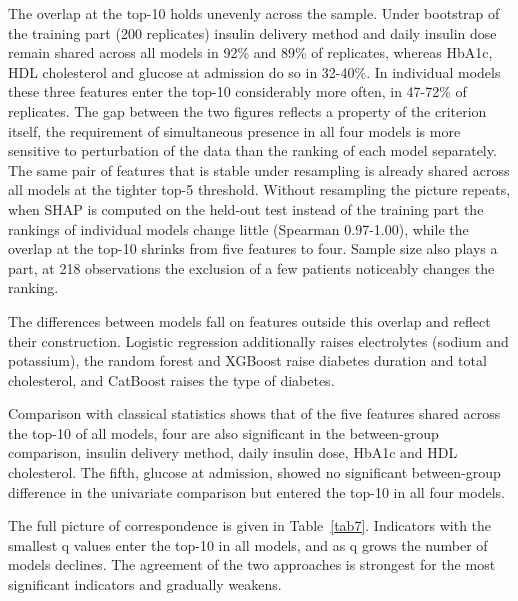 \documentclass[pdflatex,sn-basic,Numbered]{sn-jnl}
\begin{document}
The overlap at the top-10 holds unevenly across the sample. Under bootstrap of the training part (200 replicates) insulin delivery method and daily insulin dose remain shared across all models in 92\% and 89\% of replicates, whereas HbA1c, HDL cholesterol and glucose at admission do so in 32-40\%. In individual models these three features enter the top-10 considerably more often, in 47-72\% of replicates. The gap between the two figures reflects a property of the criterion itself, the requirement of simultaneous presence in all four models is more sensitive to perturbation of the data than the ranking of each model separately. The same pair of features that is stable under resampling is already shared across all models at the tighter top-5 threshold. Without resampling the picture repeats, when SHAP is computed on the held-out test instead of the training part the rankings of individual models change little (Spearman 0.97-1.00), while the overlap at the top-10 shrinks from five features to four. Sample size also plays a part, at 218 observations the exclusion of a few patients noticeably changes the ranking.

The differences between models fall on features outside this overlap and reflect their construction. Logistic regression additionally raises electrolytes (sodium and potassium), the random forest and XGBoost raise diabetes duration and total cholesterol, and CatBoost raises the type of diabetes.

Comparison with classical statistics shows that of the five features shared across the top-10 of all models, four are also significant in the between-group comparison, insulin delivery method, daily insulin dose, HbA1c and HDL cholesterol. The fifth, glucose at admission, showed no significant between-group difference in the univariate comparison but entered the top-10 in all four models.

The full picture of correspondence is given in Table~\ref{tab7}. Indicators with the smallest q values enter the top-10 in all models, and as q grows the number of models declines. The agreement of the two approaches is strongest for the most significant indicators and gradually weakens.
\end{document}
